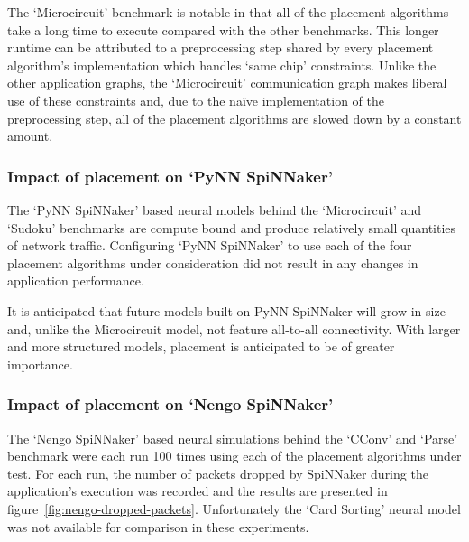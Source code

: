 				The `Microcircuit' benchmark is notable in that all of the placement
				algorithms take a long time to execute compared with the other
				benchmarks. This longer runtime can be attributed to a preprocessing
				step shared by every placement algorithm's implementation which handles
				`same chip' constraints. Unlike the other application graphs, the
				`Microcircuit' communication graph makes liberal use of these
				constraints and, due to the na\"ive implementation of the preprocessing
				step, all of the placement algorithms are slowed down by a constant
				amount.
			
			\subsubsection{Impact of placement on `PyNN SpiNNaker'}
				
				The `PyNN SpiNNaker' based neural models behind the `Microcircuit' and
				`Sudoku' benchmarks are compute bound and produce relatively small
				quantities of network traffic. Configuring `PyNN SpiNNaker' to use each
				of the four placement algorithms under consideration did not result in
				any changes in application performance.
				
				It is anticipated that future models built on PyNN SpiNNaker will grow
				in size and, unlike the Microcircuit model, not feature all-to-all
				connectivity. With larger and more structured models, placement is
				anticipated to be of greater importance.
			
			\subsubsection{Impact of placement on `Nengo SpiNNaker'}
				
				The `Nengo SpiNNaker' based neural simulations behind the `CConv' and
				`Parse' benchmark were each run \num{100} times using each of the
				placement algorithms under test. For each run, the number of packets
				dropped by SpiNNaker during the application's execution was recorded
				and the results are presented in
				figure~\ref{fig:nengo-dropped-packets}. Unfortunately the `Card
				Sorting' neural model was not available for comparison in these
				experiments.
				
